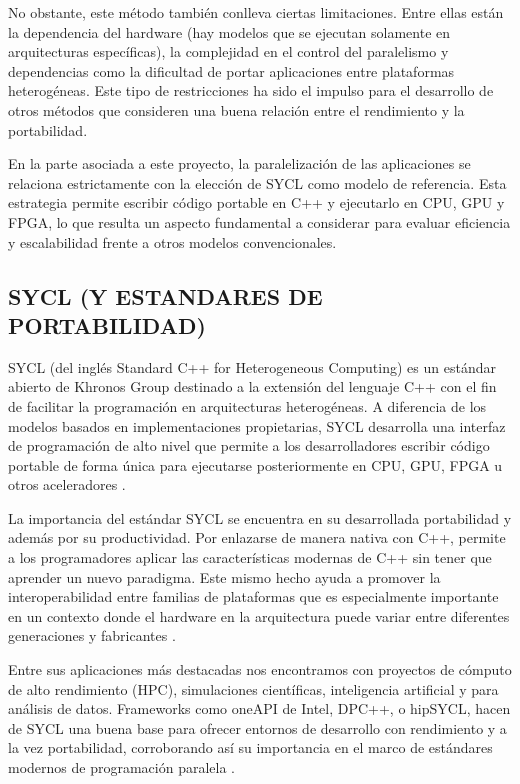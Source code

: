 \documentclass[12pt]{article}
\begin{document}
No obstante, este método también conlleva ciertas limitaciones. Entre ellas están la dependencia del hardware (hay modelos que se ejecutan solamente en arquitecturas específicas), la complejidad en el control del paralelismo y dependencias como la dificultad de portar aplicaciones entre plataformas heterogéneas. Este tipo de restricciones ha sido el impulso para el desarrollo de otros métodos que consideren una buena relación entre el rendimiento y la portabilidad.

En la parte asociada a este proyecto, la paralelización de las aplicaciones se relaciona estrictamente con la elección de SYCL como modelo de referencia. Esta estrategia permite escribir código portable en C++ y ejecutarlo en CPU, GPU y FPGA, lo que resulta un aspecto fundamental a considerar para evaluar eficiencia y escalabilidad frente a otros modelos convencionales.

\subsection{SYCL (Y ESTANDARES DE PORTABILIDAD)}

SYCL (del inglés Standard C++ for Heterogeneous Computing) es un estándar abierto de Khronos Group destinado a la extensión del lenguaje C++ con el fin de facilitar la programación en arquitecturas heterogéneas. A diferencia de los modelos basados en implementaciones propietarias, SYCL desarrolla una interfaz de programación de alto nivel que permite a los desarrolladores escribir código portable de forma única para ejecutarse posteriormente en CPU, GPU, FPGA u otros aceleradores \cite{the_khronos_group_inc_sycl_2025}.

La importancia del estándar SYCL se encuentra en su desarrollada portabilidad y además por su productividad. Por enlazarse de manera nativa con C++, permite a los programadores aplicar las características modernas de C++ sin tener que aprender un nuevo paradigma. Este mismo hecho ayuda a promover la interoperabilidad entre familias de plataformas que es especialmente importante en un contexto donde el hardware en la arquitectura puede variar entre diferentes generaciones y fabricantes \cite{reinders_data_2021}.

Entre sus aplicaciones más destacadas nos encontramos con proyectos de cómputo de alto rendimiento (HPC), simulaciones científicas, inteligencia artificial y para análisis de datos. Frameworks como oneAPI de Intel, DPC++, o hipSYCL, hacen de SYCL una buena base para ofrecer entornos de desarrollo con rendimiento y a la vez portabilidad, corroborando así su importancia en el marco de estándares modernos de programación paralela \cite{intel_technologies_intel_2025}\cite{alpay_hipsycl_2021}.
\end{document}
